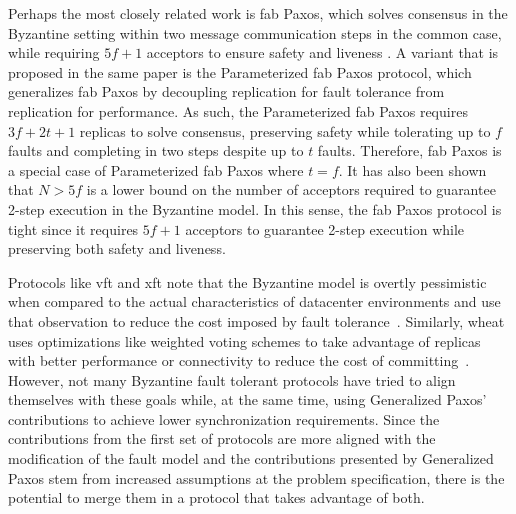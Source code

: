 Perhaps the most closely related work is \acrfull{fab} Paxos, which solves consensus in the Byzantine setting within two message communication steps in the common case, while requiring $5f+1$ acceptors to ensure safety and liveness \cite{Martin2006}. A variant that is proposed in the same paper is the Parameterized \acrshort{fab} Paxos protocol, which generalizes \acrshort{fab} Paxos by decoupling replication for fault tolerance from replication for performance. As such, the Parameterized \acrshort{fab} Paxos requires $3f+2t+1$ replicas to solve consensus, preserving safety while tolerating up to $f$ faults and completing in two steps despite up to $t$ faults. Therefore, \acrshort{fab} Paxos is a special case of Parameterized \acrshort{fab} Paxos where $t=f$. It has also been shown that $N>5f$ is a lower bound on the number of acceptors required to guarantee 2-step execution in the Byzantine model. In this sense, the \acrshort{fab} Paxos protocol is tight since it requires $5f+1$ acceptors to guarantee 2-step execution while preserving both safety and liveness. \par
Protocols like \acrshort{vft} and \acrshort{xft} note that the Byzantine model is overtly pessimistic when compared to the actual characteristics of datacenter environments and use that observation to reduce the cost imposed by fault tolerance~\cite{Porto2015,Liu2015}. Similarly, \acrshort{wheat} uses optimizations like weighted voting schemes to take advantage of replicas with better performance or connectivity to reduce the cost of committing~\cite{Sousa2016}. However, not many Byzantine fault tolerant protocols have tried to align themselves with these goals while, at the same time, using Generalized Paxos' contributions to achieve lower synchronization requirements. Since the contributions from the first set of protocols are more aligned with the modification of the fault model and the contributions presented by Generalized Paxos stem from increased assumptions at the problem specification, there is the potential to merge them in a protocol that takes advantage of both.

